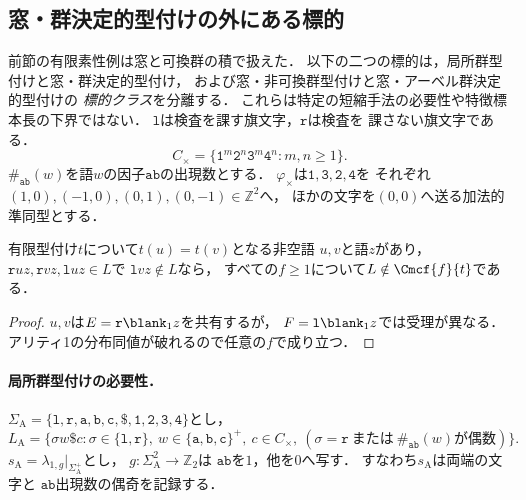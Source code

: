 \subsection{窓・群決定的型付けの外にある標的}
\label{subsec:necessity}
前節の有限素性例は窓と可換群の積で扱えた．
以下の二つの標的は，局所群型付けと窓・群決定的型付け，
および窓・非可換群型付けと窓・アーベル群決定的型付けの
\emph{標的クラス}を分離する．
これらは特定の短縮手法の必要性や特徴標本長の下界ではない．
$\mathtt l$は検査を課す旗文字，$\mathtt r$は検査を
課さない旗文字である．
\[
 C_\times=\{\mathtt1^m\mathtt2^n\mathtt3^m\mathtt4^n:m,n\ge1\}.
\]
$\#_{\mathtt{ab}}(w)$を語$w$の因子$\mathtt{ab}$の出現数とする．
$\varphi_\times$は$\mathtt1,\mathtt3,\mathtt2,\mathtt4$を
それぞれ$(1,0),(-1,0),(0,1),(0,-1)\in\mathbb Z^2$へ，
ほかの文字を$(0,0)$へ送る加法的準同型とする．

\begin{lemma}[旗文字による分離]
\label{lem:flag-separation}
有限型付け$t$について$t(u)=t(v)$となる非空語
$u,v$と語$z$があり，
$\mathtt r uz,\mathtt r vz,\mathtt l uz\in L$で
$\mathtt l vz\notin L$なら，
すべての$f\ge1$について$L\notin\Cmcf{f}{t}$である．
\end{lemma}
\begin{proof}
$u,v$は$E=\mathtt r\blank_1z$を共有するが，
$F=\mathtt l\blank_1z$では受理が異なる．
アリティ1の分布同値が破れるので任意の$f$で成り立つ．
\end{proof}

\paragraph{局所群型付けの必要性．}
$\Sigma_{\mathrm A}=\{\mathtt l,\mathtt r,\mathtt a,\mathtt b,
\mathtt c,\mathtt\$, \mathtt1,\mathtt2,\mathtt3,\mathtt4\}$とし，
\[
 L_{\mathrm A}=
 \{\sigma w\mathtt\$c:
 \sigma\in\{\mathtt l,\mathtt r\},\
 w\in\{\mathtt a,\mathtt b,\mathtt c\}^+,\ c\in C_\times,\
 (\sigma=\mathtt r\ \text{または}\
 \#_{\mathtt{ab}}(w)\text{が偶数})\}.
\]
$s_{\mathrm A}=\lambda_{1,g}|_{\Sigma_{\mathrm A}^+}$とし，
$g:\Sigma_{\mathrm A}^2\to\mathbb Z_2$は
$\mathtt{ab}$を$1$，他を$0$へ写す．
すなわち$s_{\mathrm A}$は両端の文字と
$\mathtt{ab}$出現数の偶奇を記録する．

